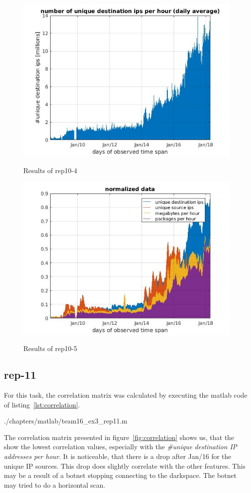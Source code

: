 \begin{figure}[H]
\center
\includegraphics[width=.7\textwidth]{./chapters/plots/rep10_4.jpg}\\
\caption{Results of rep10-4}
\end{figure}

\begin{figure}[H]
\center
\includegraphics[width=.7\textwidth]{./chapters/plots/rep10_5.jpg}\\
\caption{Results of rep10-5}
\end{figure}





\subsection*{rep-11}
For this task, the correlation matrix was calculated by executing the matlab code of listing~\ref{lst:correlation}.


				{./chapters/matlab/team16_ex3_rep11.m}

The correlation matrix presented in figure~\ref{fig:correlation} shows us, that the  show the lowest correlation values, especially with the \textit{\#unique destination IP addresses per hour}. It is noticeable, that there is a drop after Jan/16 for the unique IP sources. This drop does slightly correlate with the other features. This may be a result of a botnet stopping connecting to the darkspace. The botnet may tried to do a horizontal scan.

